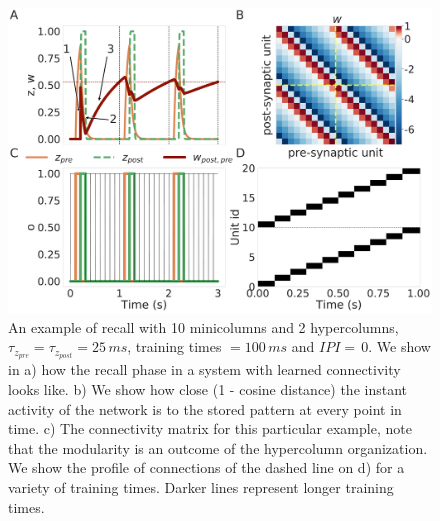 \documentclass[10pt,a4paper]{article}
\begin{document}
\begin{figure}[H]
\centering
\includegraphics[scale=0.20]{recall_example.pdf}
\caption{An example of recall with 10 minicolumns and 2 hypercolumns, $\tau_{z_{pre}} = \tau_{z_{post}}=25 \, ms$, training times $=100 \, ms$ and $IPI = \, 0 $. We show in a) how the recall phase in a system with learned connectivity looks like. b) We show how close (1 - cosine distance) the instant activity of the network is to the stored pattern at every point in time. c) The connectivity matrix for this particular example, note that the modularity is an outcome of the hypercolumn organization. We show the profile of connections of the dashed line on d) for a variety of training times. Darker lines represent longer training times. }
\label{fig:recall_example}
\end{figure}
\end{document}
